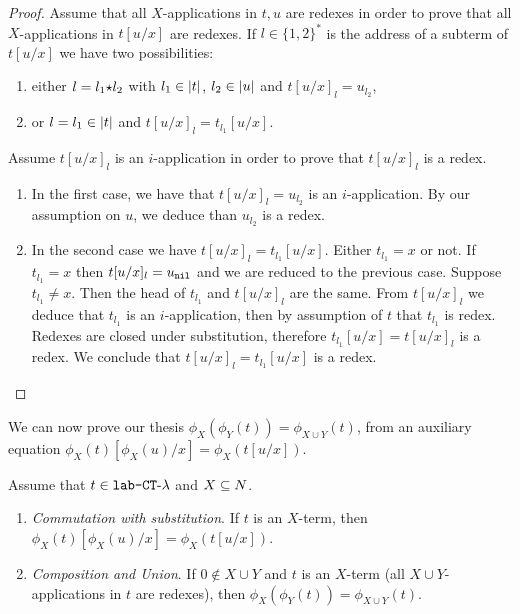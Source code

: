 \begin{proof}
Assume that all $X$-applications in $t,u$ are redexes in order to prove that 
all $X$-applications in $t[u/x]$ are redexes.
If $l \in \{1,2\}^*$ is the address of a subterm of $t[u/x]$ we have two possibilities:

\begin{enumerate}
\item
either $l = l_1 {\star} l_2$ with $ l_1 \in {|t|}$, $ l_2 \in {|u|}$ and $t[u/x]_l = u_{l_2}$,
\item
or $l = l_1 \in {|t|}$ and $t[u/x]_l = t_{l_1}[u/x]$.
\end{enumerate}
Assume $t[u/x]_l$ is an $i$-application in order to prove that $t[u/x]_l$ is a redex.

\begin{enumerate}
\item
In the first case, we have that $t[u/x]_l = u_{l_2}$ is an $i$-application. 
By our assumption on $u$, we deduce than $u_{l_2}$  is a redex.

\item
In the second case we have $t[u/x]_l = t_{l_1}[u/x]$. Either $t_{l_1}=x$ or not. 
If   $t_{l_1}=x$ then $t[u/x]_l = u_{{\tt nil}}$ and we are reduced to the previous case.
Suppose  $t_{l_1}\not =x$. Then the head of $t_{l_1}$ and $t[u/x]_l$ are the same.
From $t[u/x]_l$ we deduce that $t_{l_1}$ is an $i$-application, 
then by assumption of $t$ that $t_{l_1}$ is redex.
Redexes are closed under substitution, therefore $t_{l_1}[u/x] = t[u/x]_l $ is a redex.
We conclude that $t[u/x]_l = t_{l_1}[u/x]$ is a redex.
\end{enumerate}

\end{proof}


We can now prove our thesis $\phi_{X}(\phi_{Y}(t)) = \phi_{X \cup Y}(t)$, 
from an auxiliary equation $\phi_{X}(t)[\phi_{X}(u)/x]= \phi_{X}(t[u/x])$.




\begin{lemma}
Assume that $t \in {\mbox{\tt lab-} { {\tt CT}\mbox{-}\lambda} }$ and $X \subseteq {N}$.
\label{lemma-phi-composition-union}
\begin{enumerate}
%
%
%
%
\item
\label{lemma-phi-composition-union-02}
\emph{Commutation with substitution}.
If $t$ is an $X$-term, then $\phi_{X}(t)[\phi_{X}(u)/x]= \phi_{X}(t[u/x])$.

\item
\label{lemma-phi-composition-union-03}
\emph{Composition and Union}.
If $0 \not \in X \cup Y$ and $t$ is an $X$-term
(all $X \cup Y$-applications in $t$ are redexes), 
then $\phi_{X}(\phi_{Y}(t)) = \phi_{X \cup Y}(t)$.

\end{enumerate}
\end{lemma}



